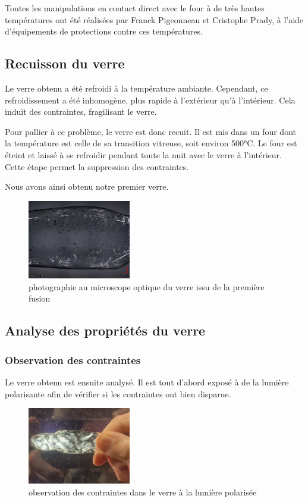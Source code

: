 \documentclass{article}
\begin{document}
Toutes les manipulations en contact direct avec le four à de très hautes températures ont été réalisées par Franck Pigeonneau et Cristophe Prady, à l'aide d'équipements de protections contre ces températures.

\subsection{Recuisson du verre}

Le verre obtenu a été refroidi à la température ambiante. Cependant, ce refroidissement a été inhomogène, plus rapide à l'extérieur qu'à l'intérieur. Cela induit des contraintes, fragilisant le verre.

Pour pallier à ce problème, le verre est donc recuit. Il est mis dans un four dont la température est celle de sa transition vitreuse, soit environ 500°C. Le four est éteint et laissé à se refroidir pendant toute la nuit avec le verre à l'intérieur. Cette étape permet la suppression des contraintes.

Nous avons ainsi obtenu notre premier verre.

\begin{figure}[ht]
    \centering
    \includegraphics[width=0.4\textwidth]{photos/mosaic.jpg}
    \caption{photographie au microscope optique du verre issu de la première fusion}
\end{figure}

\subsection{Analyse des propriétés du verre}

\subsubsection{Observation des contraintes}
Le verre obtenu est ensuite analysé. Il est tout d'abord exposé à de la lumière polarisante afin de vérifier si les contraintes ont bien disparue.

\begin{figure}[ht]
    \centering
    \includegraphics[width=0.4\textwidth]{photos/contraintes.jpg}
    \caption{observation des contraintes dans le verre à la lumière polarisée}
\end{figure}
\end{document}
